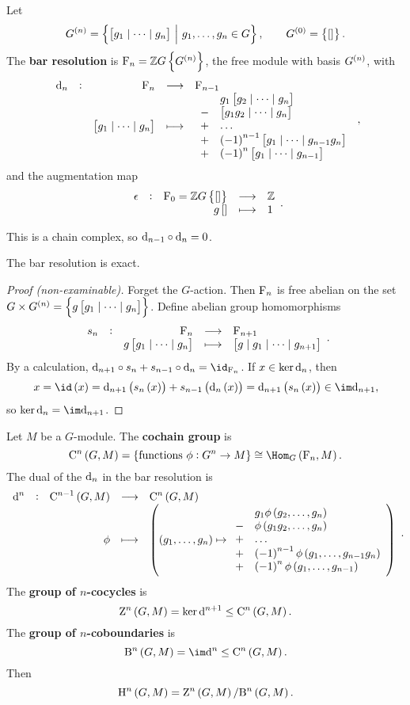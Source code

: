 \begin{definition}
Let
$$ G^{\br{n}} = \cbr{\sbr{g_1 \mid \dots \mid g_n} \st g_1, \dots, g_n \in G}, \qquad G^{\br{0}} = \cbr{\sbr{}}. $$
The \textbf{bar resolution} is $ \F_n = \ZZ G\cbr{G^{\br{n}}} $, the free module with basis $ G^{\br{n}} $, with
$$ \function[\d_n]{\F_n}{\F_{n - 1}}{\sbr{g_1 \mid \dots \mid g_n}}{
\begin{array}{rl}
& g_1\sbr{g_2 \mid \dots \mid g_n} \\
- & \sbr{g_1g_2 \mid \dots \mid g_n} \\
+ & \dots \\
+ & \br{-1}^{n - 1}\sbr{g_1 \mid \dots \mid g_{n - 1}g_n} \\
+ & \br{-1}^n\sbr{g_1 \mid \dots \mid g_{n - 1}}
\end{array}
}, $$
and the augmentation map
$$ \function[\epsilon]{\F_0 = \ZZ G\cbr{\sbr{}}}{\ZZ}{g\sbr{}}{1}. $$
\end{definition}

\begin{fact}
This is a chain complex, so $ \mathrm{d}_{n - 1} \circ \mathrm{d}_n = 0 $.
\end{fact}

\begin{proposition}
The bar resolution is exact.
\end{proposition}

\begin{proof}[Proof (non-examinable)]
Forget the $ G $-action. Then $ \mathrm{F}_n $ is free abelian on the set $ G \times G^{\br{n}} = \cbr{g\sbr{g_1 \mid \dots \mid g_n}} $. Define abelian group homomorphisms
$$ \function[s_n]{\F_n}{\F_{n + 1}}{g\sbr{g_1 \mid \dots \mid g_n}}{\sbr{g \mid g_1 \mid \dots \mid g_{n + 1}}}. $$
By a calculation, $ \d_{n + 1} \circ s_n + s_{n - 1} \circ \d_n = \id_{\F_n} $. If $ x \in \ker \mathrm{d}_n $, then
$$ x = \id\br{x} = \d_{n + 1}\br{s_n\br{x}} + s_{n - 1}\br{\d_n\br{x}} = \d_{n + 1}\br{s_n\br{x}} \in \im \d_{n + 1}, $$
so $ \ker \d_n = \im \d_{n + 1} $.
\end{proof}

\pagebreak

Let $ M $ be a $ G $-module. The \textbf{cochain group} is
$$ \C^n\br{G, M} = \cbr{\text{functions} \ \phi : G^n \to M} \cong \Hom_G\br{\F_n, M}. $$
The dual of the $ \mathrm{d}_n $ in the bar resolution is
$$ \function[\d^n]{\C^{n - 1}\br{G, M}}{\C^n\br{G, M}}{\phi}{\br{\br{g_1, \dots, g_n} \mapsto
\begin{array}{rl}
& g_1\phi\br{g_2, \dots, g_n} \\
- & \phi\br{g_1g_2, \dots, g_n} \\
+ & \dots \\
+ & \br{-1}^{n - 1}\phi\br{g_1, \dots, g_{n - 1}g_n} \\
+ & \br{-1}^n\phi\br{g_1, \dots, g_{n - 1}}
\end{array}
}}. $$
The \textbf{group of $ n $-cocycles} is
$$ \Z^n\br{G, M} = \ker \d^{n + 1} \le \C^n\br{G, M}. $$
The \textbf{group of $ n $-coboundaries} is
$$ \B^n\br{G, M} = \im \d^n \le \C^n\br{G, M}. $$
Then
$$ \H^n\br{G, M} = \Z^n\br{G, M} / \B^n\br{G, M}. $$

